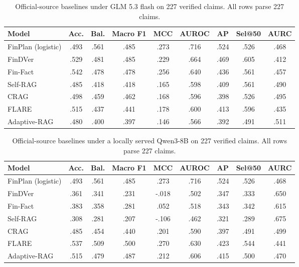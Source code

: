 \documentclass[11pt]{article}
\newcommand{\method}{FinPlan}
\begin{document}
\begin{table}[t]
\centering
\small
\setlength{\tabcolsep}{3pt}
\begin{tabular}{lcccccccc}
\toprule
Model & Acc. & Bal. & Macro F1 & MCC & AUROC & AP & Sel@50 & AURC \\
\midrule
\method{} (logistic) & .493 & .561 & .485 & .273 & .716 & .524 & .526 & .468 \\
FinDVer & .529 & .481 & .485 & .229 & .664 & .469 & .605 & .412 \\
Fin-Fact & .542 & .478 & .478 & .256 & .640 & .436 & .561 & .457 \\
Self-RAG & .485 & .418 & .418 & .165 & .598 & .409 & .561 & .490 \\
CRAG & .498 & .459 & .462 & .168 & .596 & .398 & .526 & .495 \\
FLARE & .515 & .437 & .441 & .178 & .600 & .413 & .596 & .435 \\
Adaptive-RAG & .480 & .400 & .397 & .146 & .566 & .392 & .491 & .511 \\
\bottomrule
\end{tabular}
\caption{Official-source baselines under GLM 5.3 flash on 227 verified claims. All rows parse 227 claims.}
\label{tab:glm-full}
\end{table}

\begin{table}[t]
\centering
\small
\setlength{\tabcolsep}{3pt}
\begin{tabular}{lcccccccc}
\toprule
Model & Acc. & Bal. & Macro F1 & MCC & AUROC & AP & Sel@50 & AURC \\
\midrule
\method{} (logistic) & .493 & .561 & .485 & .273 & .716 & .524 & .526 & .468 \\
FinDVer & .361 & .341 & .231 & -.018 & .502 & .347 & .333 & .650 \\
Fin-Fact & .383 & .358 & .281 & .052 & .518 & .343 & .342 & .615 \\
Self-RAG & .308 & .281 & .207 & -.106 & .462 & .321 & .289 & .675 \\
CRAG & .485 & .454 & .440 & .201 & .590 & .397 & .491 & .499 \\
FLARE & .537 & .509 & .500 & .270 & .630 & .423 & .544 & .441 \\
Adaptive-RAG & .515 & .479 & .487 & .212 & .606 & .415 & .500 & .470 \\
\bottomrule
\end{tabular}
\caption{Official-source baselines under a locally served Qwen3-8B on 227 verified claims. All rows parse 227 claims.}
\label{tab:qwen-full}
\end{table}
\end{document}
